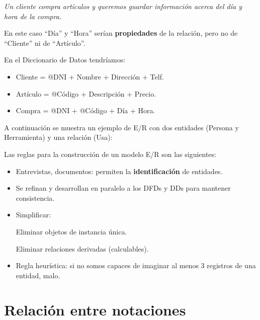 \textit{Un cliente compra artículos y queremos guardar información acerca del día y hora de la compra.}

En este caso ``Día'' y ``Hora'' serían \textbf{propiedades} de la relación, pero no de ``Cliente'' ni de ``Artículo''.

En el Diccionario de Datos tendríamos:

\begin{itemize}[noitemsep]
\item Cliente = @DNI + Nombre + Dirección + Telf.
\item Artículo = @Código + Descripción + Precio.
\item Compra = @DNI + @Código + Día + Hora.
\end{itemize}

A continuación se muestra un ejemplo de E/R con dos entidades
(Persona y Herramienta) y una relación (Usa):

\begin{center}
\end{center}

Las reglas para la construcción de un modelo E/R son las siguientes:

\begin{itemize}[noitemsep]
\item Entrevistas, documentos: permiten la \textbf{identificación} de entidades.
\item Se refinan y desarrollan en paralelo a los DFDs y DDs para mantener consistencia.
\item Simplificar:

  Eliminar objetos de instancia única.

  Eliminar relaciones derivadas (calculables).

\item Regla heurística: si no somos capaces de imaginar al menos 3 registros de una entidad, malo.
\end{itemize}

\section{Relación entre notaciones}

